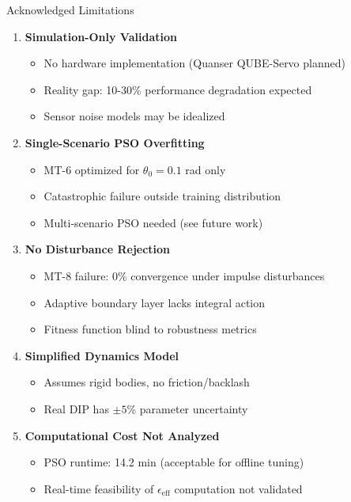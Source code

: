 \documentclass[10pt,aspectratio=169]{beamer}
\begin{document}
\begin{frame}{Acknowledged Limitations}
\begin{enumerate}
    \item \textbf{Simulation-Only Validation}
    \begin{itemize}
        \item No hardware implementation (Quanser QUBE-Servo planned)
        \item Reality gap: 10-30\% performance degradation expected
        \item Sensor noise models may be idealized
    \end{itemize}

    \item \textbf{Single-Scenario PSO Overfitting}
    \begin{itemize}
        \item MT-6 optimized for $\theta_0 = 0.1$ rad only
        \item Catastrophic failure outside training distribution
        \item Multi-scenario PSO needed (see future work)
    \end{itemize}

    \item \textbf{No Disturbance Rejection}
    \begin{itemize}
        \item MT-8 failure: 0\% convergence under impulse disturbances
        \item Adaptive boundary layer lacks integral action
        \item Fitness function blind to robustness metrics
    \end{itemize}

    \item \textbf{Simplified Dynamics Model}
    \begin{itemize}
        \item Assumes rigid bodies, no friction/backlash
        \item Real DIP has $\pm 5$\% parameter uncertainty
    \end{itemize}

    \item \textbf{Computational Cost Not Analyzed}
    \begin{itemize}
        \item PSO runtime: 14.2 min (acceptable for offline tuning)
        \item Real-time feasibility of $\epsilon_{\text{eff}}$ computation not validated
    \end{itemize}
\end{enumerate}
\end{frame}
\end{document}
